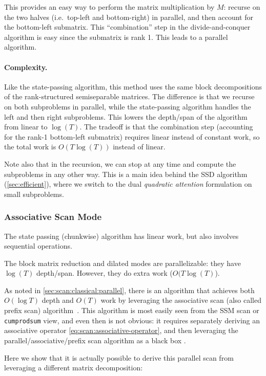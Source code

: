 This provides an easy way to perform the matrix multiplication by $M$:
recurse on the two halves (i.e.\ top-left and bottom-right) in parallel,
and then account for the bottom-left submatrix.
This ``combination'' step in the divide-and-conquer algorithm is easy since the submatrix is rank 1.
This leads to a parallel algorithm.

\paragraph{Complexity.}
Like the state-passing algorithm,
this method uses the same block decompositions of the rank-structured semiseparable matrices.
The difference is that we recurse on both subproblems in parallel,
while the state-passing algorithm handles the left and then right subproblems.
This lowers the depth/span of the algorithm from linear to $\log(T)$.
The tradeoff is that the combination step (accounting for the rank-1 bottom-left submatrix) requires linear instead of constant work,
so the total work is $O(T\log(T))$ instead of linear.

Note also that in the recursion,
we can stop at any time and compute the subproblems in any other way.
This is a main idea behind the SSD algorithm (\cref{sec:efficient}),
where we switch to the dual \emph{quadratic attention} formulation on small subproblems.


\subsubsection{Associative Scan Mode}
\label{sec:scan:associative}

The state passing (chunkwise) algorithm has linear work, but also involves sequential operations.

The block matrix reduction and dilated modes are parallelizable: they have $\log(T)$ depth/span. However, they do extra work ($O(T \log(T)$).

As noted in \cref{sec:scan:classical:parallel}, there is an algorithm that achieves both $O(\log T)$ depth and $O(T)$ work by leveraging the associative scan (also called prefix scan) algorithm~\citep{baker1996pade}.
This algorithm is most easily seen from the SSM scan or \texttt{cumprodsum} view, and even then is not obvious: it requires separately deriving an associative operator \eqref{eq:scan:associative-operator},
and then leveraging the parallel/associative/prefix scan algorithm as a black box \citep{blelloch1990prefix}.

Here we show that it is actually possible to derive this parallel scan from leveraging a different matrix decomposition:


